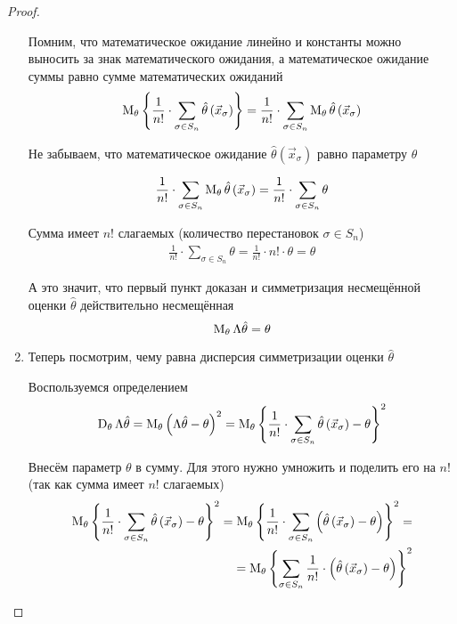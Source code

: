 \begin{proof}
\begin{enumerate}
      Помним, что математическое ожидание линейно и
      константы можно выносить за знак математического ожидания,
      а математическое ожидание суммы равно сумме математических ожиданий
      \begin{align*}
          \operatorname{M}_{\theta} \left\{\frac{1}{n!}\cdot \sum_{\sigma\in S_n}
        \hat{\theta}\left(\vec{x}_\sigma\right)\right\}
        = \frac{1}{n!}\cdot \sum_{\sigma\in S_n}
            \operatorname{M}_{\theta} \hat{\theta}\left(\vec{x}_\sigma\right)
      \end{align*}

      Не забываем, что математическое ожидание
      $\hat{\theta}\left( \vec{x}_{\sigma} \right)$ равно параметру
      $\theta$

      \begin{align*}
          \frac{1}{n!}\cdot \sum_{\sigma\in S_n}
        \operatorname{M}_{\theta} \hat{\theta}\left(\vec{x}_\sigma\right)
        = \frac{1}{n!}\cdot \sum_{\sigma\in S_n}\theta
      \end{align*}

      Сумма имеет $n!$ слагаемых (количество перестановок $\sigma\in S_n$)
      \begin{align*}
          \frac{1}{n!}\cdot \sum_{\sigma\in S_n}\theta
        = \frac{1}{n!}\cdot n!\cdot \theta
        = \theta
      \end{align*}

      А это значит, что первый пункт доказан и симметризация
      несмещённой оценки $\hat{\theta}$ действительно несмещённая
      $$\operatorname{M}_{\theta} \Lambda\hat{\theta}= \theta$$
      \item
      Теперь посмотрим, чему равна дисперсия симметризации
      оценки $\hat{\theta}$

      Воспользуемся определением
      \begin{align*}
          \operatorname{D}_{\theta} \Lambda\hat{\theta}
        = \operatorname{M}_{\theta} 
            \left(\Lambda\hat{\theta}-\theta\right)^2
        = \operatorname{M}_{\theta} 
            \left\{\frac{1}{n!}\cdot \sum_{\sigma\in S_n}
        \hat{\theta}\left(\vec{x}_\sigma\right)
        -\theta\right\}^2
      \end{align*}

      Внесём параметр $\theta$ в сумму.
      Для этого нужно умножить и поделить его на $n!$
      (так как сумма имеет $n!$ слагаемых)
      \begin{align*}
        \operatorname{M}_{\theta} \left\{\frac{1}{n!}\cdot \sum_{\sigma\in S_n}
          \hat{\theta}\left(\vec{x}_\sigma\right)-\theta\right\}^2
        = \operatorname{M}_{\theta} 
          \left\{\frac{1}{n!}\cdot \sum_{\sigma\in S_n}
      \left(\hat{\theta}\left(\vec{x}_\sigma\right)
      -\theta\right)\right\}^2 = \\
        = \operatorname{M}_{\theta} 
          \left\{\sum_{\sigma\in S_n}\frac{1}{n!}\cdot
      \left(\hat{\theta}\left(\vec{x}_\sigma\right)
      -\theta\right)\right\}^2
      \end{align*}


\end{enumerate}
\end{proof}
